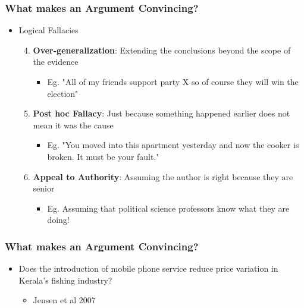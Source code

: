 \documentclass[xcolor=x11names,compress]{beamer}\usepackage[]{graphicx}\usepackage[]{color}
\renewcommand{\(}{\begin{columns}}
\renewcommand{\)}{\end{columns}}
\newcommand{\<}[1]{\begin{column}{#1}}
\renewcommand{\>}{\end{column}}
\begin{document}
\begin{frame}
\frametitle{What makes an Argument Convincing?}
\begin{itemize}
\item Logical Fallacies
\begin{enumerate}
\setcounter{enumi}{3}
\item \textbf{Over-generalization}: Extending the conclusions beyond the scope of the evidence
\begin{itemize}
\item Eg. "All of my friends support party X so of course they will win the election"
\end{itemize}
\item \textbf{Post hoc Fallacy}: Just because something happened earlier does not mean it was the cause
\begin{itemize}
\item Eg. "You moved into this apartment yesterday and now the cooker is broken. It must be your fault."
\end{itemize}
\item \textbf{Appeal to Authority}: Assuming the author is right because they are senior
\begin{itemize}
\item Eg. Assuming that political science professors know what they are doing!
\end{itemize}
\end{enumerate}
\end{itemize}
\end{frame}

\begin{frame}
\frametitle{What makes an Argument Convincing?}
\begin{itemize}
\item Does the introduction of mobile phone service reduce price variation in Kerala's fishing industry?
\begin{itemize}
\item Jensen et al 2007
\end{itemize}
\end{itemize}
\end{frame}


\end{document}
